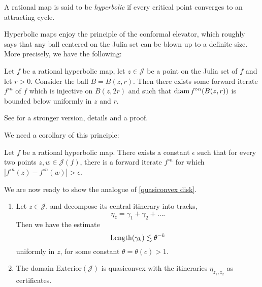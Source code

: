 A rational map is said to be \emph{hyperbolic} if every critical point converges to an attracting cycle.

Hyperbolic maps enjoy the principle of the conformal elevator, which roughly says that any ball centered on the Julia set can be blown up to a definite size. More precisely, we have the following:

\begin{proposition} \label{elevator}
	Let $f$ be a rational hyperbolic map, let $z\in \mathcal J$ be a point on the Julia set of $f$ and let $r>0$. Consider the ball $B=B(z,r)$. Then there exists some forward iterate $f^{\circ n}$ of $f$ which is injective on $B(z,2r)$ and such that
	$\operatorname{diam} {f^{\circ n}(B(z,r))}$ is bounded below uniformly in $z$ and $r$. 
\end{proposition}

See \cite{bonk_quasisymmetries_2016} for a stronger version, details and a proof.

We need a corollary of this principle:

\begin{corollary} \label{elevator for points on julia}
	Let $f$ be a rational hyperbolic map. There exists a constant $\epsilon$ such that for every two points $z,w\in\mathcal{J}(f)$, there is a forward iterate
$f^{\circ n}$ for which $\left|f^{\circ n}(z)-f^{\circ n}(w)\right|>\epsilon$.	
\end{corollary}

\begin{comment}
\begin{proof}
	Apply \cref{elevator} to a ball centered on the Julia set which contains $z,w$ on its boundary at roughly antipodal points. After blowing up we get points $f^{\circ n}(z),f^{\circ n}(w)$ which are a definite distance apart by Koebe's distortion theorem. %
\end{proof}
\end{comment}

We are now ready to show the analogue of \cref{quasiconvex disk}.
\begin{theorem} 
\begin{enumerate}[label=(\roman*)]

\item Let $z\in\mathcal{J}$, and decompose its central itinerary into tracks, 
\begin{equation*}
\eta_z = \gamma _1 +\gamma_2 +\ldots.
\end{equation*}
Then we have the estimate
\begin{equation*}
\operatorname{Length}(\gamma_{k})\lesssim\theta^{-k}
\end{equation*}
uniformly in
$z$, for some constant $\theta=\theta(c)>1$.

\item The domain $\mathrm{Exterior}(\mathcal{J})$ is quasiconvex with the itineraries $\eta_{z_1,z_2}$ as certificates.
	\end{enumerate}
\end{theorem}

